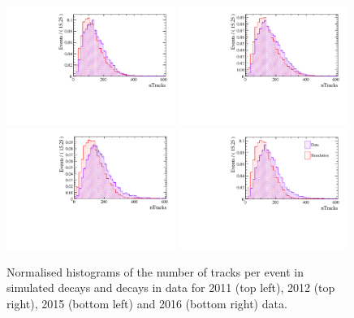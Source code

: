 \begin{figure}[ht]
  \centering
    \includegraphics[width=0.49\textwidth]{./Figs/LifetimeMeasurement/Bd2KPi_2011_data_MC_nTracks.pdf}
    \includegraphics[width=0.49\textwidth]{./Figs/LifetimeMeasurement/Bd2KPi_2012_data_MC_nTracks.pdf}
    \includegraphics[width=0.49\textwidth]{./Figs/LifetimeMeasurement/Bd2KPi_2015_data_MC_nTracks.pdf}
    \includegraphics[width=0.49\textwidth]{./Figs/LifetimeMeasurement/Bd2KPi_2016_data_MC_nTracks.pdf}
  \caption{Normalised histograms of the number of tracks per event in simulated \bdkpi decays and \bdkpi decays in data for 2011 (top left), 2012 (top right), 2015 (bottom left) and 2016 (bottom right) data. }
  \label{fig:nTracksMCDataComp}
\end{figure}
\FloatBarrier



